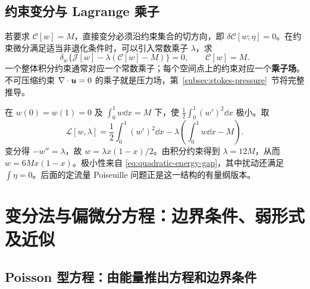 \subsection{约束变分与 Lagrange 乘子}

若要求 $\mathcal C[w]=M$，直接变分必须沿约束集合的切方向，即 $\delta\mathcal C[w;\eta]=0$。在约束微分满足适当非退化条件时，可以引入常数乘子 $\lambda$，求
\begin{equation}
 \delta_w\{\mathcal J[w]-\lambda(\mathcal C[w]-M)\}=0,
 \qquad \mathcal C[w]=M.
\end{equation}
一个整体积分约束通常对应一个常数乘子；每个空间点上的约束对应一个\textbf{乘子场}。不可压缩约束 $\nabla\cdot\bm{u}=0$ 的乘子就是压力场，第~\ref{subsec:stokes-pressure}~节将完整推导。

\begin{example}[固定总量的最小梯度能]
在 $w(0)=w(1)=0$ 及 $\int_0^1w\dd x=M$ 下，使 $\frac12\int_0^1(w')^2\dd x$ 极小。取
\begin{equation}
 \mathcal L[w,\lambda]=\frac12\int_0^1(w')^2\dd x
 -\lambda\left(\int_0^1w\dd x-M\right).
\end{equation}
变分得 $-w''=\lambda$，故 $w=\lambda x(1-x)/2$。由积分约束得到 $\lambda=12M$，从而 $w=6Mx(1-x)$。极小性来自 \eqref{eq:quadratic-energy-gap}，其中扰动还满足 $\int\eta=0$。后面的定流量 Poiseuille 问题正是这一结构的有量纲版本。
\end{example}

\section{变分法与偏微分方程：边界条件、弱形式及近似}\label{sec:variation-weak}

\subsection{Poisson 型方程：由能量推出方程和边界条件}

